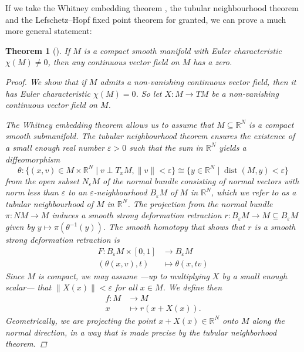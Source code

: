 \documentclass[A4paper, 12pt, british, reqno]{amsart}
\newcommand{\R}{\mathbb{R}} %
\theoremstyle{plain}
\newtheorem{thm}{Theorem}[section]
\theoremstyle{definition}
\theoremstyle{remark}
\theoremstyle{plain}
\theoremstyle{definition}
\theoremstyle{remark}
\theoremstyle{plain}
\theoremstyle{definition}
\theoremstyle{remark}
\begin{document}
{\color{gray}
If we take the Whitney embedding theorem \cite[Theorem II.10.7]{bre93}, the tubular neighbourhood theorem \cite[Theorem II.11.4]{bre93} and the Lefschetz--Hopf fixed point theorem \cite[Theorem IV.23.4]{bre93} for granted, we can prove a much more general statement:

\begin{thm}[{\cite[Corollary IV.23.6]{bre93}}]
    If $M$ is a compact smooth manifold with Euler characteristic $\chi(M)\neq 0$, then any continuous vector field on $M$ has a zero.
    \begin{proof}
	We show that if $M$ admits a non-vanishing continuous vector field, then it has Euler characteristic $\chi(M)=0$.
	So let $X\colon M\to TM$ be a non-vanishing continuous vector field on $M$.

	The Whitney embedding theorem \cite[Theorem II.10.7]{bre93} allows us to assume that $M\subseteq \R^{N}$ is a compact smooth submanifold.
	The tubular neighbourhood theorem \cite[Theorem II.11.4]{bre93} ensures the existence of a small enough real number $\varepsilon >0$ such that the sum in $\R^{N}$ yields a diffeomorphism
	\[ \theta\colon \{ (x,v)\in M\times \R^{N}\mid v\perp T_{x}M, \lVert v \rVert<\varepsilon \} \cong \{ y\in \R^{N}\mid \operatorname{dist}(M,y)<\varepsilon\} \]
	from the open subset $N_{\varepsilon}M$ of the normal bundle consisting of normal vectors with norm less than $\varepsilon$ to an $\varepsilon$-neighbourhood $B_{\varepsilon}M$ of $M$ in $\R^{N}$, which we refer to as a \textit{tubular neighbourhood} of $M$ in $\R^{N}$.
	The projection from the normal bundle $\pi\colon NM\to M$ induces a smooth strong deformation retraction $r\colon B_{\varepsilon}M\to M\subseteq B_{\varepsilon}M$ given by $y\mapsto \pi(\theta^{-1}(y))$.
	The smooth homotopy that shows that $r$ is a smooth strong deformation retraction \cite[Definition I.14.8]{bre93} is
	\begin{align*}
	    F\colon B_{\varepsilon}M\times [0,1] & \longrightarrow B_{\varepsilon}M \\
	    (\theta(x,v),t) & \longmapsto \theta(x,tv)
	\end{align*}
	Since $M$ is compact, we may assume ---up to multiplying $X$ by a small enough scalar--- that $\lVert X(x) \rVert<\varepsilon$ for all $x\in M$.
	We define then
	\begin{align*}
	    f\colon M &\longrightarrow M\\
	    x &\longmapsto r(x+X(x)).
	\end{align*}
	Geometrically, we are projecting the point $x+X(x)\in \R^{N}$ onto $M$ along the normal direction, in a way that is made precise by the tubular neighborhood theorem.


\end{proof}
\end{thm}}
\end{document}
